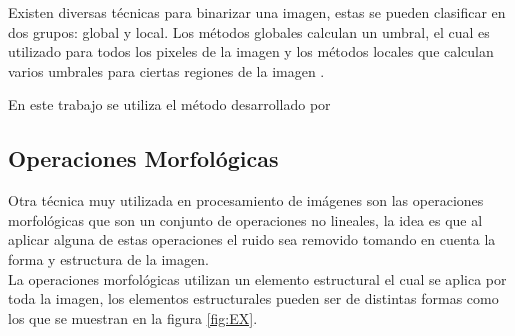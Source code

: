 Existen diversas técnicas para binarizar una imagen, estas se pueden clasificar en dos grupos: global y local. Los métodos globales calculan un umbral, el cual es utilizado para todos los pixeles de la imagen y los métodos locales que calculan varios umbrales para ciertas regiones de la imagen \citep{Chaki2014}.  

En este trabajo se utiliza el método desarrollado por \citep{Otsu1979}

\subsection{Operaciones Morfológicas}\label{subsec:OperacionesMorfologicas} 

Otra técnica muy utilizada en procesamiento de imágenes son las operaciones morfológicas que son un conjunto de operaciones no lineales, la idea es que al aplicar alguna de estas operaciones el ruido sea removido tomando en cuenta la forma y estructura de la imagen.\\ 
La operaciones morfológicas \citep{Premaratne2013} utilizan un elemento estructural el cual se aplica por toda la imagen, los elementos estructurales pueden ser de distintas formas como los que se muestran en la figura \ref{fig:EX}.
